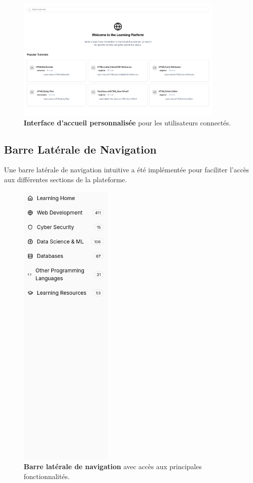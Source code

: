 \begin{figure}[h!]
  \centering
  \includegraphics[width=0.9\textwidth,keepaspectratio]{week_3_img/accueil.png}
  \caption{\textbf{Interface d'accueil personnalisée} pour les utilisateurs connectés.}
  \label{fig:user_dashboard}
\end{figure}

\subsection{Barre Latérale de Navigation}

Une barre latérale de navigation intuitive a été implémentée pour faciliter l'accès aux différentes sections de la plateforme.

\begin{figure}[h!]
  \centering
  \includegraphics[width=0.4\textwidth,keepaspectratio]{week_3_img/sidebare.png}
  \caption{\textbf{Barre latérale de navigation} avec accès aux principales fonctionnalités.}
  \label{fig:sidebar_nav}
\end{figure}

